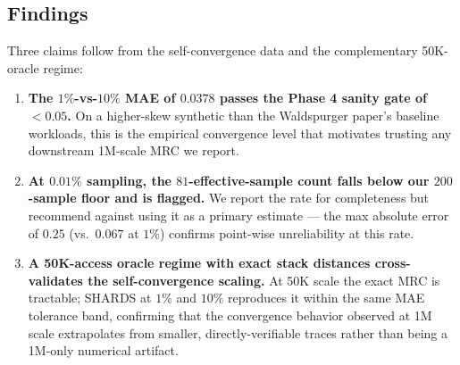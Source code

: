 \subsection*{Findings}

Three claims follow from the self-convergence data and the complementary
50K-oracle regime:

\begin{enumerate}[leftmargin=*,itemsep=0pt,topsep=2pt]
  \item \textbf{The $1\%$-vs-$10\%$ MAE of $0.0378$ passes the Phase 4
    sanity gate of $<0.05$.} On a higher-skew synthetic than the
    Waldspurger paper's baseline workloads, this is the empirical
    convergence level that motivates trusting any downstream 1M-scale MRC
    we report.
  \item \textbf{At $0.01\%$ sampling, the $81$-effective-sample count falls
    below our $200$-sample floor and is flagged.} We report the rate for
    completeness but recommend against using it as a primary estimate ---
    the max absolute error of $0.25$ (vs.\ $0.067$ at $1\%$) confirms
    point-wise unreliability at this rate.
  \item \textbf{A 50K-access oracle regime with exact stack distances
    cross-validates the self-convergence scaling.} At 50K scale the exact
    MRC is tractable; SHARDS at $1\%$ and $10\%$ reproduces it within the
    same MAE tolerance band, confirming that the convergence behavior
    observed at 1M scale extrapolates from smaller, directly-verifiable
    traces rather than being a 1M-only numerical artifact.
\end{enumerate}
